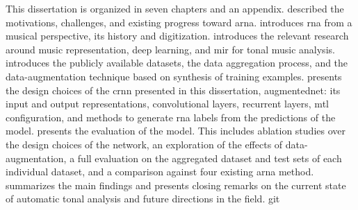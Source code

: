 
This dissertation is organized in seven chapters and an
appendix.  described the motivations,
challenges, and existing progress toward \gls{arna}.
 introduces
\gls{rna} from a musical perspective, its history and
digitization.  introduces the relevant
research around music representation, deep learning, and
\gls{mir} for tonal music analysis.
 introduces the
publicly available datasets, the data aggregation process,
and the data-augmentation technique based on synthesis of
training examples.  presents the design
choices of the \gls{crnn} presented in this dissertation,
\gls{augmentednet}: its input and output representations,
convolutional layers, recurrent layers, \gls{mtl}
configuration, and methods to generate \gls{rna} labels from
the predictions of the model.
 presents the evaluation of
the model. This includes ablation studies over the design
choices of the network, an exploration of the effects of
data-augmentation, a full evaluation on the aggregated
dataset and test sets of each individual dataset, and a
comparison against four existing \gls{arna} method.
 summarizes the main findings and
presents closing remarks on the current state of automatic
tonal analysis and future directions in the field. git 
